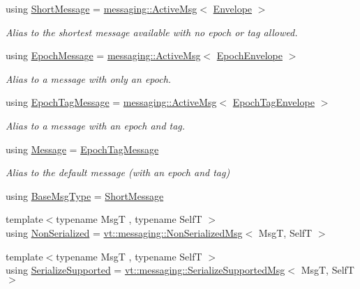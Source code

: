\begin{DoxyCompactItemize}
using \hyperlink{namespacevt_a1125ac1da6c0bbf141e0ea0739d7602d}{Short\+Message} = \hyperlink{structvt_1_1messaging_1_1_active_msg}{messaging\+::\+Active\+Msg}$<$ \hyperlink{namespacevt_aa9c8cc094b5361482021d63012987814}{Envelope} $>$
\begin{DoxyCompactList}\small\item\em Alias to the shortest message available with no epoch or tag allowed. \end{DoxyCompactList}\item 
using \hyperlink{namespacevt_ad67368ffae52d7325002586b41bb150e}{Epoch\+Message} = \hyperlink{structvt_1_1messaging_1_1_active_msg}{messaging\+::\+Active\+Msg}$<$ \hyperlink{namespacevt_af71a025689a3da5037785b53a7a8e78c}{Epoch\+Envelope} $>$
\begin{DoxyCompactList}\small\item\em Alias to a message with only an epoch. \end{DoxyCompactList}\item 
using \hyperlink{namespacevt_a4ccc13b06bff8a4a35426a1a082a95a9}{Epoch\+Tag\+Message} = \hyperlink{structvt_1_1messaging_1_1_active_msg}{messaging\+::\+Active\+Msg}$<$ \hyperlink{namespacevt_af23b58014ced6898422213a0e5e6a27a}{Epoch\+Tag\+Envelope} $>$
\begin{DoxyCompactList}\small\item\em Alias to a message with an epoch and tag. \end{DoxyCompactList}\item 
using \hyperlink{namespacevt_a3a3ddfef40b4c90915fa43cdd5f129ea}{Message} = \hyperlink{namespacevt_a4ccc13b06bff8a4a35426a1a082a95a9}{Epoch\+Tag\+Message}
\begin{DoxyCompactList}\small\item\em Alias to the default message (with an epoch and tag) \end{DoxyCompactList}\item 
using \hyperlink{namespacevt_a44d0d4e144748f2b19a1cfd962f50338}{Base\+Msg\+Type} = \hyperlink{namespacevt_a1125ac1da6c0bbf141e0ea0739d7602d}{Short\+Message}
\item 
{\footnotesize template$<$typename MsgT , typename SelfT $>$ }\\using \hyperlink{namespacevt_a378e4a02213923b4ba1c3f9d2a1424c7}{Non\+Serialized} = \hyperlink{structvt_1_1messaging_1_1_non_serialized_msg}{vt\+::messaging\+::\+Non\+Serialized\+Msg}$<$ MsgT, SelfT $>$
\item 
{\footnotesize template$<$typename MsgT , typename SelfT $>$ }\\using \hyperlink{namespacevt_a3862b8e3f67ab03f3a4313d828592fa9}{Serialize\+Supported} = \hyperlink{structvt_1_1messaging_1_1_serialize_supported_msg}{vt\+::messaging\+::\+Serialize\+Supported\+Msg}$<$ MsgT, SelfT $>$

\end{DoxyCompactItemize}

